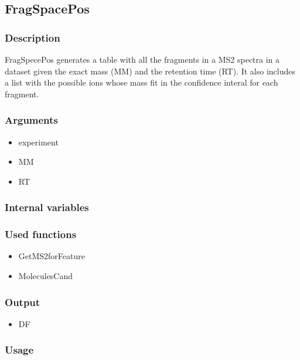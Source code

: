 \subsection{FragSpacePos}\label{FragSpacePos}
\subsubsection{Description}
FragSpecePos generates a table with all the fragments in a MS2 spectra in a dataset given the exact mass (MM) and the retention time (RT). It also includes a list with the possible ions whose mass fit in the confidence interal for each fragment.
\subsubsection{Arguments}
\begin{itemize}
\item experiment
\item MM
\item RT
\end{itemize}
\subsubsection{Internal variables}
\subsubsection{Used functions}
\begin{itemize}
\item GetMS2forFeature
\item MoleculesCand
\end{itemize}
\subsubsection{Output}
\begin{itemize}
\item DF
\end{itemize}
\subsubsection{Usage}
